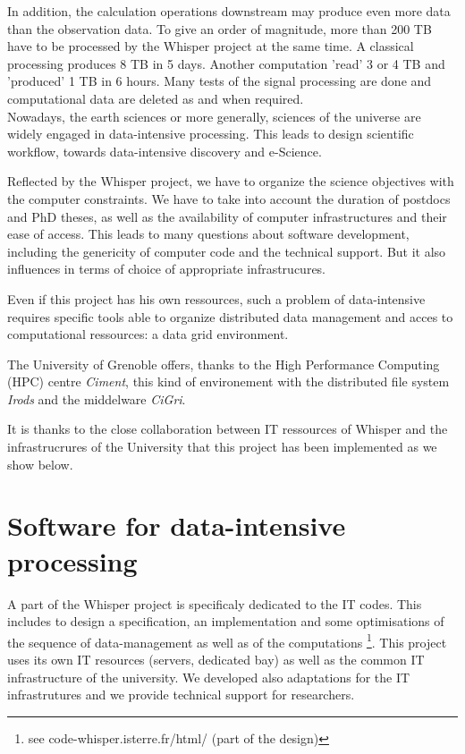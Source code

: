 \documentclass[a4paper, 10pt]{article}
\begin{document}
\begin{multicols}{2}
In addition, the calculation operations downstream may produce even more data than the observation data.
To give an order of magnitude, more than 200 TB have to be processed by the Whisper project at the same time. 
A classical processing produces 8 TB in 5 days. Another computation 'read' 3 or 4 TB and 'produced' 1 TB in 6 hours.
Many tests of the signal processing are done and computational data are deleted as and when required.
\\


Nowadays, the earth sciences or more generally, sciences of the universe are widely engaged in
data-intensive processing. This leads to design scientific workflow, towards data-intensive discovery and e-Science.


Reflected by the Whisper project, we have to organize the science objectives with
the computer constraints. We have to take into account 
the duration of postdocs and PhD theses, as well as the availability of computer infrastructures and their ease of access. 
This leads to many questions about software development, including the genericity of computer code and 
the technical support. But it also influences in terms of choice of appropriate infrastrucures.

Even if this project has his own ressources, such a problem of data-intensive requires specific tools able to 
organize distributed data management and acces to computational ressources: a data grid environment.

The University of Grenoble offers, thanks to the High Performance Computing (HPC) centre \emph{Ciment}, this kind of environement with the distributed file system \emph{Irods}
and the middelware \emph{CiGri}.%


It is thanks to the close collaboration between IT ressources of Whisper and the infrastrucrures of the University
that this project has been implemented as we show below.



\section{Software for data-intensive processing} \label{Section_Software_for_data-intensive_processing} %


A part of the Whisper project is specificaly dedicated to the IT codes. This includes to design a specification, an implementation and some optimisations of the sequence of data-management as well as of the computations \footnote{see code-whisper.isterre.fr/html/ (part of the design)}.
This project uses its own IT resources (servers, dedicated bay) as well as the common IT infrastructure of the university.
We developed also adaptations for the IT infrastrutures and we provide technical support for researchers.


\end{multicols}
\end{document}
